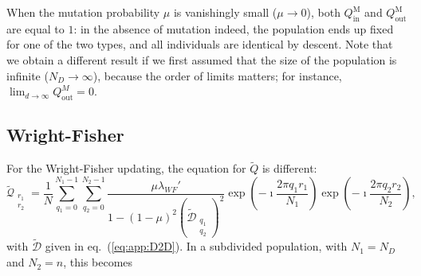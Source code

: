 \documentclass[11pt, letterpaper]{article}
\renewcommand{\eqref}[1]{\textup{{\normalfont eq.~(\ref{#1}}\normalfont)}}
\newcommand{\Moran}{\textrm{M}}
\newcommand{\inn}{\textrm{in}}
\newcommand{\out}{\textrm{out}}
\newcommand{\Qin}{Q_{\inn}}
\newcommand{\Qout}{Q_{\out}}
\newcommand{\ndemes}{N_D}
\begin{document}
When the mutation probability $\mu$ is vanishingly small ($\mu \to 0$), both $\Qin^{\Moran}$ and $\Qout^{\Moran}$ are equal to $1$: in the absence of mutation indeed, the population ends up fixed for one of the two types, and all individuals are identical by descent. Note that we obtain a different result if we first assumed that the size of the population is infinite ($\ndemes \to \infty$), because the order of limits matters; %
for instance, $\lim_{d\to \infty} \Qout^{M}=0$. 

\subsection{Wright-Fisher}
For the Wright-Fisher updating, the equation for $\tilde{Q}$ is different:
\begin{equation}
\tilde{\mathcal{Q}}_{\substack{r_1\\r_2}} = \frac{1}{N} \sum_{q_1=0}^{N_1-1} \sum_{q_2=0}^{N_2 -1} \frac{\mu \lambda_{WF}'}{1-(1-\mu)^2 (\tilde{\mathcal{D}}_{\substack{q_1\\q_2}})^2} \exp\left(-\imath \frac{2\pi q_1 r_1}{N_1}\right)\exp\left(-\imath \frac{2\pi q_2 r_2}{N_2}\right), 
\end{equation}
with $\tilde{\mathcal{D}}$ given in \eqref{eq:app:D2D}. In a subdivided population, with $N_1 = \ndemes$ and $N_2 = n$, this becomes
\end{document}
